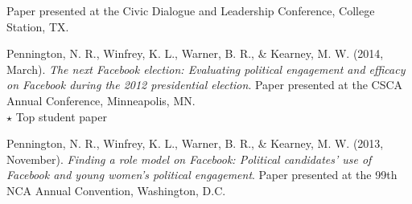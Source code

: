 \begin{bibenum}
      Paper presented at the Civic Dialogue and Leadership Conference, College Station, TX.
    \item[] Pennington, N. R., Winfrey, K. L., Warner, B. R., \& Kearney, M. W. (2014, March).
      \textit{The next Facebook election: Evaluating political engagement and efficacy on Facebook during the 2012 presidential election}.
      Paper presented at the CSCA Annual Conference, Minneapolis, MN.\\
      {$\star$} Top student paper
    \item[] Pennington, N. R., Winfrey, K. L., Warner, B. R., \& Kearney, M. W. (2013, November).
      \textit{Finding a role model on Facebook: Political candidates' use of Facebook and young women's political engagement}.
      Paper presented at the 99th NCA Annual Convention, Washington, D.C.
  \end{bibenum}

  \vspace{1.5em}
